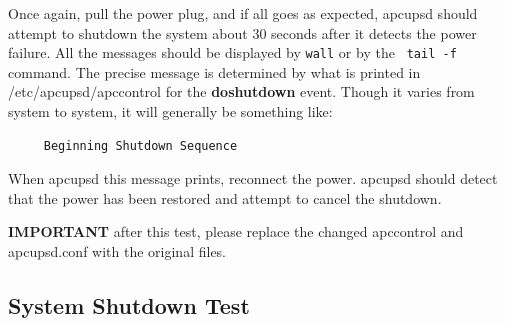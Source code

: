 Once again, pull the power plug, and if all goes as expected, apcupsd should
attempt to shutdown the system about 30 seconds after it detects the power
failure. All the messages should be displayed by {\tt wall} or by the {\tt
tail -f} command. The precise message is determined by what is printed in
/etc/apcupsd/apccontrol for the {\bf doshutdown} event.  Though it varies from
system to system, it will generally be something like: 

\footnotesize
\begin{verbatim}
     Beginning Shutdown Sequence
\end{verbatim}
\normalsize

When apcupsd this message prints, reconnect the power.  apcupsd should detect
that the power has been restored and attempt to cancel the shutdown.  

{\bf IMPORTANT} after this test, please replace the changed apccontrol and
apcupsd.conf with the original files. 

\label{System-Shutdown-Test}

\subsection*{System Shutdown Test}

